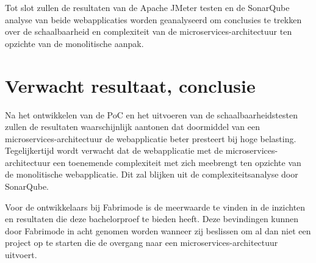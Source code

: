 Tot slot zullen de resultaten van de Apache JMeter testen en de SonarQube analyse van beide webapplicaties worden geanalyseerd om conclusies te trekken over de schaalbaarheid en complexiteit van de microservices-architectuur ten opzichte van de monolitische aanpak.

\section{Verwacht resultaat, conclusie}%
\label{sec:verwachte_resultaten}

Na het ontwikkelen van de PoC en het uitvoeren van de schaalbaarheidstesten zullen de resultaten waarschijnlijk aantonen dat doormiddel van een microservices-architectuur de webapplicatie beter presteert bij hoge belasting. Tegelijkertijd wordt verwacht dat de webapplicatie met de microservices-architectuur een toenemende complexiteit met zich meebrengt ten opzichte van de monolitische webapplicatie. Dit zal blijken uit de complexiteitsanalyse door SonarQube.

Voor de ontwikkelaars bij Fabrimode is de meerwaarde te vinden in de inzichten en resultaten die deze bachelorproef te bieden heeft. Deze bevindingen kunnen door Fabrimode in acht genomen worden wanneer zij beslissen om al dan niet een project op te starten die de overgang naar een microservices-architectuur uitvoert.

